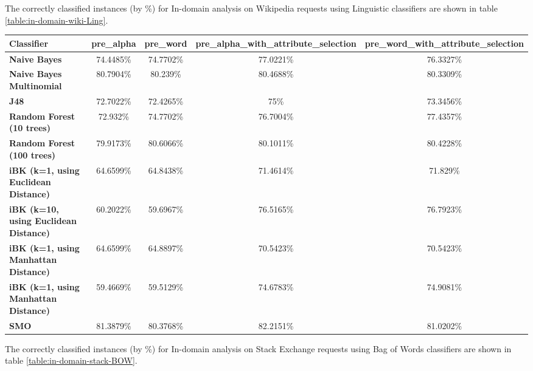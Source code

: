 \documentclass[conference]{IEEEtran}
\begin{document}
The correctly classified instances (by \%) for In-domain analysis on Wikipedia requests using Linguistic classifiers are shown in table \ref{table:in-domain-wiki-Ling}.

\begin{table*}[htbp]
\caption{In-domain analysis on Wikipedia requests using Linguistic classifiers }
\centering
\vspace{5pt}
\begin{tabular}{|l|c|c|c|c|}
\hline
\textbf{Classifier} & \textbf{pre\_alpha} & \textbf{pre\_word} & \textbf{pre\_alpha\_with\_attribute\_selection} & \textbf{pre\_word\_with\_attribute\_selection} \\
\hline\hline
\textbf{Naive Bayes} & 74.4485\% & 74.7702\% & 77.0221\% & 76.3327\% \\ 
\hline
\textbf{Naive Bayes Multinomial} & 80.7904\% & 80.239\% & 80.4688\% & 80.3309\% \\ 
\hline
\textbf{J48} & 72.7022\% & 72.4265\% & 75\% & 73.3456\% \\ 
\hline
\textbf{Random Forest (10 trees)} & 72.932\% & 74.7702\% & 76.7004\% & 77.4357\% \\ 
\hline
\textbf{Random Forest (100 trees)} & 79.9173\% & 80.6066\% & 80.1011\% & 80.4228\% \\ 
\hline
\textbf{iBK (k=1, using Euclidean Distance)} & 64.6599\% & 64.8438\% & 71.4614\% & 71.829\% \\ 
\hline
\textbf{iBK (k=10, using Euclidean Distance)} & 60.2022\% & 59.6967\% & 76.5165\% & 76.7923\% \\ 
\hline
\textbf{iBK (k=1, using Manhattan Distance)} & 64.6599\% & 64.8897\% & 70.5423\% & 70.5423\% \\ 
\hline
\textbf{iBK (k=1, using Manhattan Distance)} & 59.4669\% & 59.5129\% & 74.6783\% & 74.9081\% \\ 
\hline
\textbf{SMO} & 81.3879\% & 80.3768\% & 82.2151\% & 81.0202\% \\ 
\hline
\hline
\end{tabular}
\label{table:in-domain-wiki-Ling}
\end{table*}

The correctly classified instances (by \%) for In-domain analysis on Stack Exchange requests using Bag of Words classifiers are shown in table \ref{table:in-domain-stack-BOW}.
\end{document}
